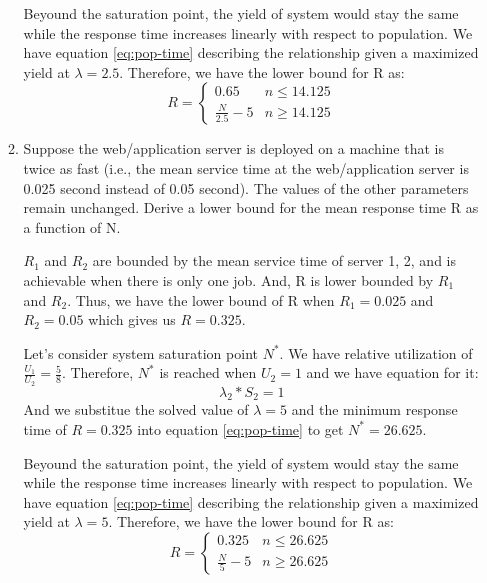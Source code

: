 \documentclass[12pt]{article}
\begin{document}
\begin{enumerate}
\begin{enumerate}
Beyound the saturation point, the yield of system would stay the same while the response time increases linearly with respect to population. We have equation \ref{eq:pop-time} describing the relationship given a maximized yield at $\lambda = 2.5$. Therefore, we have the lower bound for R as:
\begin{equation*}
R = \begin{cases}
               0.65                                      & n \le 14.125\\
               \frac{N}{2.5} - 5                    & n \ge 14.125
           \end{cases}
\end{equation*}

\item{} Suppose the web/application server is deployed on a machine that is twice as fast (i.e., the mean service time at the web/application server is 0.025 second instead of 0.05 second). The values of the other parameters remain unchanged. Derive a lower bound for the mean response time R as a function of N.

$R_1$ and $R_2$ are bounded by the mean service time of server 1, 2, and is achievable when there is only one job. And, R is lower bounded by $R_1$ and $R_2$. Thus, we have the lower bound of R when $R_1 = 0.025$ and $R_2 = 0.05$ which gives us $R = 0.325$.

Let's consider system saturation point $N^*$. We have relative utilization of $\frac{U_1}{U_2} = \frac{5}{8}$. Therefore, $N^*$ is reached when $U_2 = 1$ and we have equation for it:
\begin{equation}
\lambda_2 * S_2 = 1
\end{equation}
And we substitue the solved value of $\lambda = 5$ and the minimum response time of $R = 0.325$ into equation \ref{eq:pop-time} to get  $N^* = 26.625$.

Beyound the saturation point, the yield of system would stay the same while the response time increases linearly with respect to population. We have equation \ref{eq:pop-time} describing the relationship given a maximized yield at $\lambda = 5$. Therefore, we have the lower bound for R as:
\begin{equation*}
R = \begin{cases}
               0.325                                   & n \le 26.625\\
               \frac{N}{5} - 5                      & n \ge 26.625
           \end{cases}
\end{equation*}


\end{enumerate}
\end{enumerate}
\end{document}
